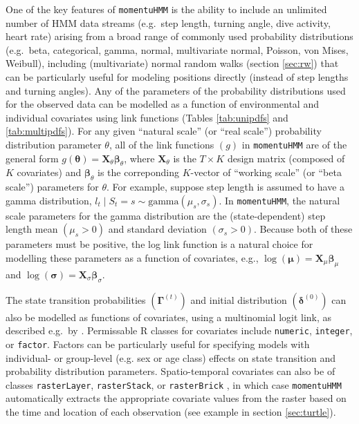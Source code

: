 \documentclass[12pt]{article}\usepackage[]{graphicx}\usepackage[]{xcolor}
\begin{document}
One of the key features of \verb|momentuHMM| is the ability to include an unlimited number of HMM data streams (e.g.\ step length, turning angle, dive activity, heart rate) arising from a broad range of commonly used probability distributions (e.g.\ beta, categorical, gamma, normal, multivariate normal, Poisson, von Mises, Weibull), including (multivariate) normal random walks (section \ref{sec:rw}) that can be particularly useful for modeling positions directly (instead of step lengths and turning angles). Any of the parameters of the probability distributions used for the observed data can be modelled as a function of environmental and individual covariates using link functions (Tables \ref{tab:unipdfs} and \ref{tab:multipdfs}). For any given ``natural scale'' (or ``real scale'') probability distribution parameter $\theta$, all of the link functions $(g)$ in \verb|momentuHMM| are of the general form $g({\boldsymbol \theta}) =  {\mathbf X}_\theta{\boldsymbol \beta}_\theta$, where ${\mathbf X}_\theta$ is the $T \times K$ design matrix (composed of $K$ covariates) and ${\boldsymbol \beta}_\theta$ is the correponding $K$-vector of ``working scale'' (or ``beta scale'') parameters for $\theta$. For example, suppose step length is assumed to have a gamma distribution, $l_t\mid S_t=s \sim \text{gamma}(\mu_s,\sigma_s)$. In \verb|momentuHMM|, the natural scale parameters for the gamma distribution are the (state-dependent) step length mean $(\mu_s>0)$ and standard deviation $(\sigma_s>0)$.  Because both of these parameters must be positive, the log link function is a natural choice for modelling these parameters as a function of covariates, e.g., $\log({\boldsymbol \mu}) =  {\mathbf X}_\mu  {\boldsymbol \beta}_\mu$ and $\log({\boldsymbol \sigma}) =  {\mathbf X}_\sigma  {\boldsymbol \beta}_\sigma$.

The state transition probabilities $({\mathbf \Gamma}^{(t)})$ and initial distribution $({\boldsymbol \delta}^{(0)})$ can also be modelled as functions of covariates, using a multinomial logit link, as described e.g.\ by \cite{MichelotEtAl2016}. Permissable R classes for covariates include \verb|numeric|, \verb|integer|, or \verb|factor|. Factors can be particularly useful for specifying models with individual- or group-level (e.g. sex or age class) effects on state transition and probability distribution parameters. Spatio-temporal covariates can also be of classes \verb|rasterLayer|, \verb|rasterStack|, or \verb|rasterBrick| \citep{Hijmans2016}, in which case \verb|momentuHMM| automatically extracts the appropriate covariate values from the raster based on the time and location of each observation (see example in section \ref{sec:turtle}).
\end{document}
